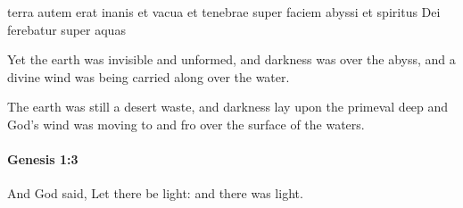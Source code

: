 			\begin{framed}
			\scriptsize
				\begin{compactdesc}
					\item[BHS] 
					\item[LXX] 
					\item[BSV] terra autem erat inanis et vacua et tenebrae super faciem abyssi et spiritus Dei ferebatur super aquas
					\item[NETS] Yet the earth was invisible and unformed, and darkness was over the abyss, and a divine wind was being carried along over the water.
					\item[WGC] The earth was still a desert waste, and darkness lay upon the primeval deep and God's wind was moving to and fro over the surface of the waters.
				\end{compactdesc}
			\end{framed}

		\paragraph{Genesis 1:3} %
			\label{GENESIS-1-3}

			And God said, Let there be light: and there was light.


